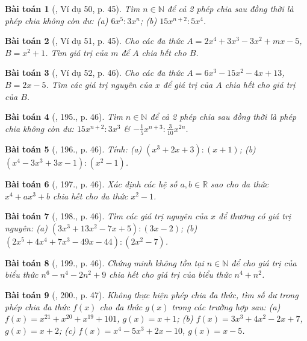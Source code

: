 \documentclass{article}
\newtheorem{baitoan}{Bài toán}
\begin{document}
\begin{baitoan}[\cite{Tuyen_Toan_7}, Ví dụ 50, p. 45]
	Tìm $n\in\mathbb{N}$ để cả 2 phép chia sau đồng thời là phép chia không còn dư: (a) $6x^5:3x^n$; (b) $15x^{n+2}:5x^4$.
\end{baitoan}

\begin{baitoan}[\cite{Tuyen_Toan_7}, Ví dụ 51, p. 45]
	Cho các đa thức $A = 2x^4 + 3x^3 - 3x^2 + mx - 5$, $B = x^2 + 1$. Tìm giá trị của $m$ để $A$ chia hết cho $B$.
\end{baitoan}

\begin{baitoan}[\cite{Tuyen_Toan_7}, Ví dụ 52, p. 46]
	Cho các đa thức $A = 6x^3 - 15x^2 - 4x + 13$, $B = 2x - 5$. Tìm các giá trị nguyên của $x$ để giá trị của $A$ chia hết cho giá trị của $B$.
\end{baitoan}

\begin{baitoan}[\cite{Tuyen_Toan_7}, 195., p. 46]
	Tìm $n\in\mathbb{N}$ để cả 2 phép chia sau đồng thời là phép chia không còn dư: $15x^{n+2}:3x^3$ \& $-\frac{1}{5}x^{n+3}:\frac{3}{10}x^{2n}$.
\end{baitoan}

\begin{baitoan}[\cite{Tuyen_Toan_7}, 196., p. 46]
	Tính: (a) $(x^3 + 2x + 3):(x + 1)$; (b) $(x^4 - 3x^3 + 3x - 1):(x^2 - 1)$.
\end{baitoan}

\begin{baitoan}[\cite{Tuyen_Toan_7}, 197., p. 46]
	Xác định các hệ số $a,b\in\mathbb{R}$ sao cho đa thức $x^4 + ax^3 + b$ chia hết cho đa thức $x^2 - 1$.
\end{baitoan}

\begin{baitoan}[\cite{Tuyen_Toan_7}, 198., p. 46]
	Tìm các giá trị nguyên của $x$ để thương có giá trị nguyên: (a) $(3x^3 + 13x^2 - 7x + 5):(3x - 2)$; (b) $(2x^5 + 4x^4 + 7x^3 - 49x - 44):(2x^2 - 7)$.
\end{baitoan}

\begin{baitoan}[\cite{Tuyen_Toan_7}, 199., p. 46]
	Chứng minh không tồn tại $n\in\mathbb{N}$ để cho giá trị của biểu thức $n^6 - n^4 - 2n^2 + 9$ chia hết cho giá trị của biểu thức $n^4 + n^2$.
\end{baitoan}

\begin{baitoan}[\cite{Tuyen_Toan_7}, 200., p. 47]
	Không thực hiện phép chia đa thức, tìm số dư trong phép chia đa thức $f(x)$ cho đa thức $g(x)$ trong các trường hợp sau: (a) $f(x) = x^{21} + x^{20} + x^{19} + 101$, $g(x) = x + 1$; (b) $f(x) = 3x^3 + 4x^2 - 2x + 7$, $g(x) = x + 2$; (c) $f(x) = x^4 - 5x^3 + 2x - 10$, $g(x) = x - 5$.
\end{baitoan}
\end{document}
